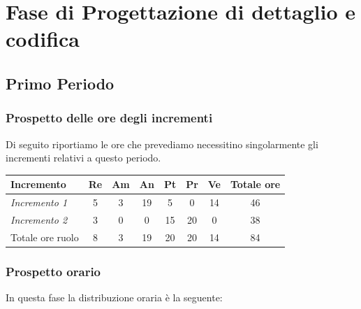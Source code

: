 {{{{{{\section{Fase di Progettazione di dettaglio e codifica}\label{PreventivoFaseDiProgettazioneDiDettaglioECodifica}

\subsection{Primo Periodo}\label{PreventivoFaseDiProgettazioneDiDettaglioECodificaPeriodo1}

\subsubsection{Prospetto delle ore degli incrementi}\label{PreventivoFaseDiProgettazioneDiDettaglioECodificaPeriodo1Incrementi}
Di seguito riportiamo le ore che prevediamo necessitino singolarmente gli incrementi relativi a questo periodo.
\quad
\def\tabularxcolumn#1{m{#1}}
{
	
	\begin{center}
		\renewcommand{\arraystretch}{1.4}
		\begin{tabularx}{\textwidth}{|X|c|c|c|c|c|c|c|}
			\hline
			\rowcolor{airforceblue}
			\textbf{Incremento} & \textbf{Re} & \textbf{Am} & \textbf{An} & \textbf{Pt} & \textbf{Pr} & \textbf{Ve} & \textbf{Totale ore}\\
			\hline
			\textit{Incremento 1} & 5 & 3 & 19 & 5 & 0 & 14 & 46\\
			\hline
			\textit{Incremento 2} & 3 & 0 & 0 & 15 & 20 & 0 & 38\\
			\hline
			Totale ore ruolo & 8 & 3 & 19 & 20 & 20 & 14 & 84\\
			\hline
		\end{tabularx}
	\end{center}

\subsubsection{Prospetto orario}\label{PreventivoFaseDiProgettazioneDiDettaglioECodificaProspettoOrarioPeriodo1}
In questa fase la distribuzione oraria è la seguente:
\quad
\def\tabularxcolumn#1{m{#1}}
{

}}}}}}}}
